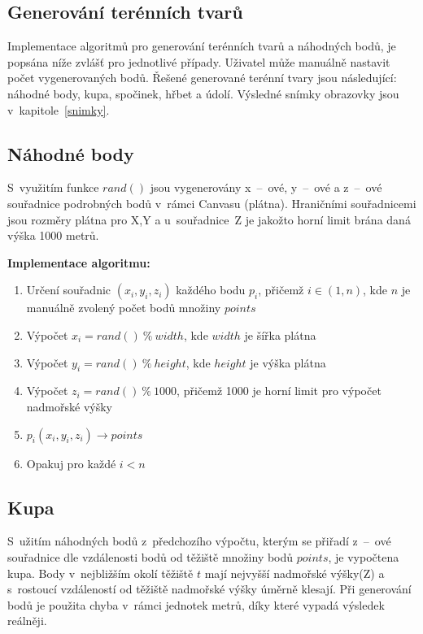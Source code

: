 \documentclass[a4paper, 12pt, oneside, titlepage]{article} %
\begin{document}
\subsection{Generování terénních tvarů}\label{gen_ter_tvar}
Implementace algoritmů pro generování terénních tvarů a náhodných bodů, je popsána níže zvlášť pro jednotlivé případy. Uživatel může manuálně nastavit počet vygenerovaných bodů. Řešené generované terénní tvary jsou následující: náhodné body, kupa, spočinek, hřbet a údolí. Výsledné snímky obrazovky jsou v~kapitole~\ref{snimky}.

\subsection{Náhodné body}
S~využitím funkce $rand()$ jsou vygenerovány x~--~ové, y~--~ové a z~--~ové souřadnice podrobných bodů v~rámci Canvasu (plátna). Hraničními souřadnicemi jsou rozměry plátna pro X,Y a u~souřadnice~Z je jakožto horní limit brána daná výška 1000 metrů.  

\textbf{Implementace algoritmu:}
\begin{enumerate}
\item Určení souřadnic $(x_i,y_i,z_i)$ každého bodu $p_i$, přičemž $i \in (1,n)$, kde $n$ je manuálně zvolený počet bodů množiny $points$
\item \quad Výpočet $x_i=rand()~\%~width$, kde $width$ je šířka plátna
\item \quad Výpočet $y_i=rand()~\%~height$, kde $height$ je výška plátna
\item \quad Výpočet $z_i=rand()~\%~1000$, přičemž 1000 je horní limit pro výpočet nadmořské výšky
\item \quad $p_i(x_i,y_i,z_i) \rightarrow points$
\item Opakuj pro každé $i<n$
\end{enumerate}

\subsection{Kupa}\label{kupa}
S~užitím náhodných bodů z~předchozího výpočtu, kterým se přiřadí z~--~ové souřadnice dle vzdálenosti bodů od těžiště množiny bodů $points$, je vypočtena kupa. Body v~nejbližším okolí těžiště $t$ mají nejvyšší nadmořské výšky(Z) a s~rostoucí vzdáleností od těžiště nadmořské výšky úměrně klesají. Při generování bodů je použita chyba v~rámci jednotek metrů, díky které vypadá výsledek reálněji. 
\end{document}
